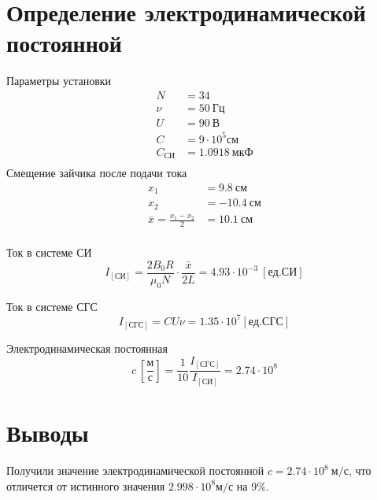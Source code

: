 \documentclass{article}
\begin{document}
\section{Определение электродинамической постоянной}
Параметры установки
\begin{align*}
    N &= 34\\
    \nu &= 50\ Гц\\
    U &= 90\ В \\
    C &= 9 \cdot 10^5 см \\
    C_{СИ} &= 1.0918 \ мкФ \\
\end{align*}
Смещение зайчика после подачи тока
\begin{align*}
    x_1 &= 9.8\ см\\
    x_2 &= -10.4\ см\\
    \bar{x} = \frac{x_1 - x_2}{2} &= 10.1\ см\\
\end{align*}

Ток в системе СИ
\begin{equation*}
    I_{[СИ]} = \frac{2 B_0 R}{\mu_0 N} \cdot \frac{\bar{x}}{2L} = 4.93 \cdot 10^{-3}\ [ед. СИ]
\end{equation*}

Ток в системе СГС
\begin{equation*}
    I_{[СГС]} = CU\nu = 1.35 \cdot 10^7 [ед. СГС]
\end{equation*}

Электродинамическая постоянная
\begin{equation*}
    c\ \left[\frac{м}{с}\right] = \frac{1}{10} \frac{I_{[СГС]}}{I_{[СИ]}}=2.74\cdot10^8
\end{equation*}

\section{Выводы}
Получили значение электродинамической постоянной $c=2.74 \cdot 10^8\ м/с$, что отличется
от истинного значения $2.998 \cdot 10^8 м/с$ на 9\%.
\end{document}
